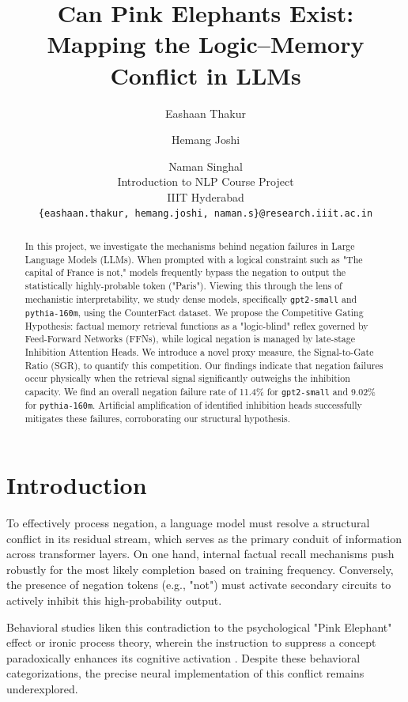 \documentclass[11pt]{article}
\title{Can Pink Elephants Exist:\\Mapping the Logic--Memory Conflict in LLMs}
\author{
  Eashaan Thakur \and Hemang Joshi \and Naman Singhal \\
  Introduction to NLP Course Project \\
  IIIT Hyderabad \\
  \texttt{\{eashaan.thakur, hemang.joshi, naman.s\}@research.iiit.ac.in}
}
\begin{document}
\maketitle

\begin{abstract}
In this project, we investigate the mechanisms behind negation failures in Large Language Models (LLMs). When prompted with a logical constraint such as "The capital of France is not," models frequently bypass the negation to output the statistically highly-probable token ("Paris"). Viewing this through the lens of mechanistic interpretability, we study dense models, specifically \texttt{gpt2-small} and \texttt{pythia-160m}, using the CounterFact dataset. We propose the Competitive Gating Hypothesis: factual memory retrieval functions as a "logic-blind" reflex governed by Feed-Forward Networks (FFNs), while logical negation is managed by late-stage Inhibition Attention Heads. We introduce a novel proxy measure, the Signal-to-Gate Ratio (SGR), to quantify this competition. Our findings indicate that negation failures occur physically when the retrieval signal significantly outweighs the inhibition capacity. We find an overall negation failure rate of 11.4\% for \texttt{gpt2-small} and 9.02\% for \texttt{pythia-160m}. Artificial amplification of identified inhibition heads successfully mitigates these failures, corroborating our structural hypothesis.
\end{abstract}

\section{Introduction}
\label{sec:intro}
To effectively process negation, a language model must resolve a structural conflict in its residual stream, which serves as the primary conduit of information across transformer layers. On one hand, internal factual recall mechanisms push robustly for the most likely completion based on training frequency. Conversely, the presence of negation tokens (e.g., "not") must activate secondary circuits to actively inhibit this high-probability output.

Behavioral studies liken this contradiction to the psychological "Pink Elephant" effect or ironic process theory, wherein the instruction to suppress a concept paradoxically enhances its cognitive activation \citep{vrabcova2024}. Despite these behavioral categorizations, the precise neural implementation of this conflict remains underexplored.
\end{document}

